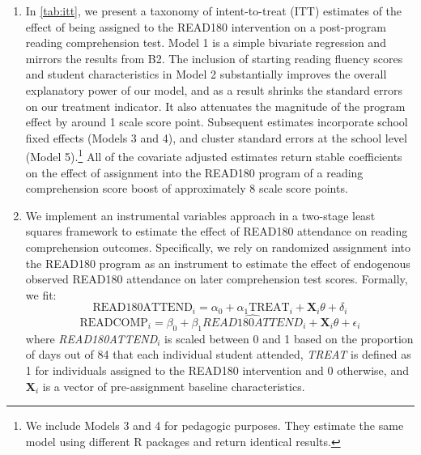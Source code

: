 \documentclass[a4paper, 11pt]{article}
\begin{document}
\begin{enumerate}
	\item[B3.] In \autoref{tab:itt}, we present a taxonomy of intent-to-treat (ITT) estimates of the effect of being assigned to the READ180 intervention on a post-program reading comprehension test. Model 1 is a simple bivariate regression and mirrors the results from B2. The inclusion of starting reading fluency scores and student characteristics in Model 2 substantially improves the overall explanatory power of our model, and as a result shrinks the standard errors on our treatment indicator. It also attenuates the magnitude of the program effect by around 1 scale score point. Subsequent estimates incorporate school fixed effects (Models 3 and 4), and cluster standard errors at the school level (Model 5).\footnote{We include Models 3 and 4 for pedagogic purposes. They estimate the same model using different R packages and return identical results.} All of the covariate adjusted estimates return stable coefficients on the effect of assignment into the READ180 program of a reading comprehension score boost of approximately 8 scale score points.

	


	\item[B4.] We implement an instrumental variables approach in a two-stage least squares framework to estimate the effect of READ180 attendance on reading comprehension outcomes. Specifically, we rely on randomized assignment into the READ180 program as an instrument to estimate the effect of endogenous observed READ180 attendance on later comprehension test scores. Formally, we fit:
	\begin{equation}
	\text{READ180ATTEND}_i = \alpha_0 + \alpha_1 \text{TREAT}_i + \textbf{X}_i \theta + \delta_i
	\end{equation}
	\begin{equation}
	\text{READCOMP}_i = \beta_0 + \beta_1 \hat{READ180ATTEND}_i + \textbf{X}_i \theta + \epsilon_i
	\end{equation}
	where \textit{READ180ATTEND}$_{i}$ is scaled between 0 and 1 based on the proportion of days out of 84 that each individual student attended, \textit{TREAT} is defined as 1 for individuals assigned to the READ180 intervention and 0 otherwise, and \textbf{X}$_{i}$ is a vector of pre-assignment baseline characteristics. 
	

\end{enumerate}
\end{document}
